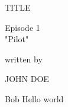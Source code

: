 \documentclass{article}
\begin{document}
\begin{screenplay}

    \null
    \vfill
    \begin{center}
        \begin{underline}
            {TITLE}
        \end{underline}

        Episode 1\\
        "Pilot"

        written by

        JOHN DOE

    \end{center}
    \vfill

    \newpage



    \fadein


%
%    
%
%
%
%
%
%
%
%
%
    \begin{dialogue}{Bob}
        Hello world
    \end{dialogue}
%
%
%
%
%
%
%
%
%
%
%
%
%
%
%
%
%
%
%
    \fadeout

    \theend
\end{screenplay}
\end{document}
